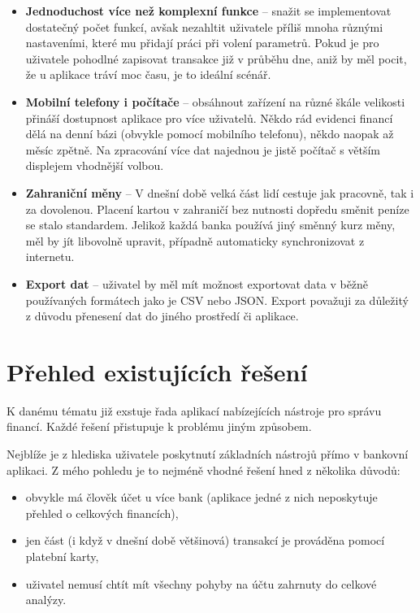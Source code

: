 \documentclass[
  biblatex,
  figures=true,
  tables=false,
  glossaries,
  index
]{kidiplom}
\begin{document}
\begin{itemize}
  \item \textbf{Jednoduchost více než komplexní funkce} -- snažit se implementovat dostatečný počet funkcí, avšak nezahltit uživatele příliš mnoha různými nastaveními, které mu přidají práci při volení parametrů. Pokud je pro uživatele pohodlné zapisovat transakce již v průběhu dne, aniž by měl pocit, že u aplikace tráví moc času, je to ideální scénář.
  \item \textbf{Mobilní telefony i počítače} -- obsáhnout zařízení na různé škále velikosti přináší dostupnost aplikace pro více uživatelů. Někdo rád evidenci financí dělá na denní bázi (obvykle pomocí mobilního telefonu), někdo naopak až měsíc zpětně. Na zpracování více dat najednou je jistě počítač s větším displejem vhodnější volbou.
  \item \textbf{Zahraniční měny} -- V dnešní době velká část lidí cestuje jak pracovně, tak i za dovolenou. Placení kartou v zahraničí bez nutnosti dopředu směnit peníze se stalo standardem. Jelikož každá banka používá jiný směnný kurz měny, měl by jít libovolně upravit, případně automaticky synchronizovat z internetu.
  \item \textbf{Export dat} -- uživatel by měl mít možnost exportovat data v běžně používaných formátech jako je CSV nebo JSON. Export považuji za důležitý z důvodu přenesení dat do jiného prostředí či aplikace.
\end{itemize}

\section{Přehled existujících řešení}
K danému tématu již exstuje řada aplikací nabízejících nástroje pro správu financí. Každé řešení přistupuje k problému jiným způsobem. 

Nejblíže je z hlediska uživatele poskytnutí základních nástrojů přímo v bankovní aplikaci. Z mého pohledu je to nejméně vhodné řešení hned z několika důvodů:
\begin{itemize}
  \item obvykle má člověk účet u více bank (aplikace jedné z nich neposkytuje přehled o celkových financích),
  \item jen část (i když v dnešní době většinová) transakcí je prováděna pomocí platební karty,
  \item uživatel nemusí chtít mít všechny pohyby na účtu zahrnuty do celkové analýzy.
\end{itemize}
\end{document}
